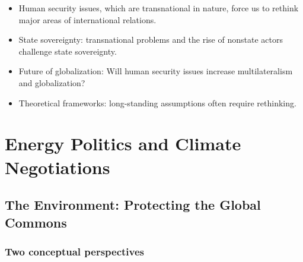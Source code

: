 \documentclass[
]{book}
\begin{document}
\begin{itemize}
\item
  Human security issues, which are transnational in nature, force us to rethink major areas of international relations.
\item
  State sovereignty: transnational problems and the rise of nonstate actors challenge state sovereignty.
\item
  Future of globalization: Will human security issues increase multilateralism and globalization?
\item
  Theoretical frameworks: long-standing assumptions often require rethinking.
\end{itemize}

\hypertarget{energy-politics-and-climate-negotiations}{%
\chapter{Energy Politics and Climate Negotiations}\label{energy-politics-and-climate-negotiations}}

\hypertarget{the-environment-protecting-the-global-commons}{%
\section{The Environment: Protecting the Global Commons}\label{the-environment-protecting-the-global-commons}}

\hypertarget{two-conceptual-perspectives}{%
\subsection{Two conceptual perspectives}\label{two-conceptual-perspectives}}
\end{document}
